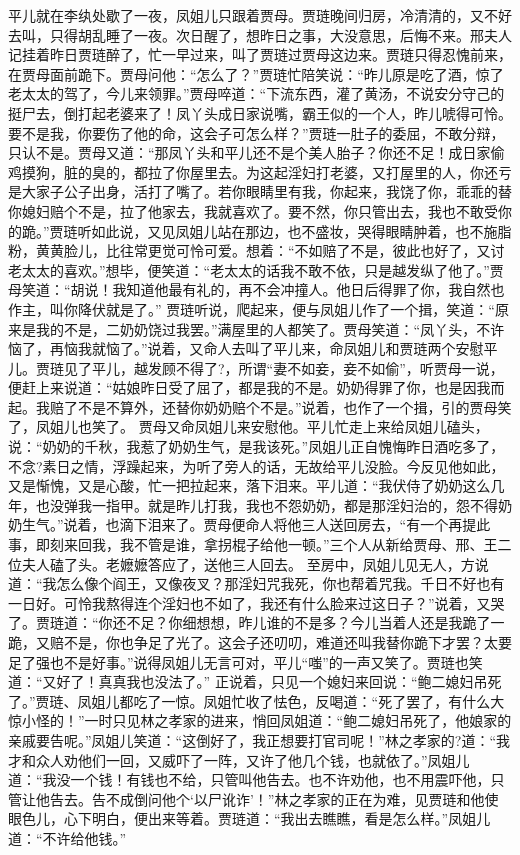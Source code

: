\documentclass[12pt,oneside]{book}
\begin{document}
平儿就在李纨处歇了一夜，凤姐儿只跟着贾母。贾琏晚间归房，冷清清的，又不好去叫，只得胡乱睡了一夜。次日醒了，想昨日之事，大没意思，后悔不来。邢夫人记挂着昨日贾琏醉了，忙一早过来，叫了贾琏过贾母这边来。贾琏只得忍愧前来，在贾母面前跪下。贾母问他：“怎么了？”贾琏忙陪笑说：“昨儿原是吃了酒，惊了老太太的驾了，今儿来领罪。”贾母啐道：“下流东西，灌了黄汤，不说安分守己的挺尸去，倒打起老婆来了！凤丫头成日家说嘴，霸王似的一个人，昨儿唬得可怜。要不是我，你要伤了他的命，这会子可怎么样？”贾琏一肚子的委屈，不敢分辩，只认不是。贾母又道：“那凤丫头和平儿还不是个美人胎子？你还不足！成日家偷鸡摸狗，脏的臭的，都拉了你屋里去。为这起淫妇打老婆，又打屋里的人，你还亏是大家子公子出身，活打了嘴了。若你眼睛里有我，你起来，我饶了你，乖乖的替你媳妇赔个不是，拉了他家去，我就喜欢了。要不然，你只管出去，我也不敢受你的跪。”贾琏听如此说，又见凤姐儿站在那边，也不盛妆，哭得眼睛肿着，也不施脂粉，黄黄脸儿，比往常更觉可怜可爱。想着：“不如赔了不是，彼此也好了，又讨老太太的喜欢。”想毕，便笑道：“老太太的话我不敢不依，只是越发纵了他了。”贾母笑道：“胡说！我知道他最有礼的，再不会冲撞人。他日后得罪了你，我自然也作主，叫你降伏就是了。”
贾琏听说，爬起来，便与凤姐儿作了一个揖，笑道：“原来是我的不是，二奶奶饶过我罢。”满屋里的人都笑了。贾母笑道：“凤丫头，不许恼了，再恼我就恼了。”说着，又命人去叫了平儿来，命凤姐儿和贾琏两个安慰平儿。贾琏见了平儿，越发顾不得了?，所谓“妻不如妾，妾不如偷”，听贾母一说，便赶上来说道：“姑娘昨日受了屈了，都是我的不是。奶奶得罪了你，也是因我而起。我赔了不是不算外，还替你奶奶赔个不是。”说着，也作了一个揖，引的贾母笑了，凤姐儿也笑了。
贾母又命凤姐儿来安慰他。平儿忙走上来给凤姐儿磕头，说：“奶奶的千秋，我惹了奶奶生气，是我该死。”凤姐儿正自愧悔昨日酒吃多了，不念?素日之情，浮躁起来，为听了旁人的话，无故给平儿没脸。今反见他如此，又是惭愧，又是心酸，忙一把拉起来，落下泪来。平儿道：“我伏侍了奶奶这么几年，也没弹我一指甲。就是昨儿打我，我也不怨奶奶，都是那淫妇治的，怨不得奶奶生气。”说着，也滴下泪来了。贾母便命人将他三人送回房去，“有一个再提此事，即刻来回我，我不管是谁，拿拐棍子给他一顿。”三个人从新给贾母、邢、王二位夫人磕了头。老嬷嬷答应了，送他三人回去。
至房中，凤姐儿见无人，方说道：“我怎么像个阎王，又像夜叉？那淫妇咒我死，你也帮着咒我。千日不好也有一日好。可怜我熬得连个淫妇也不如了，我还有什么脸来过这日子？”说着，又哭了。贾琏道：“你还不足？你细想想，昨儿谁的不是多？今儿当着人还是我跪了一跪，又赔不是，你也争足了光了。这会子还叨叨，难道还叫我替你跪下才罢？太要足了强也不是好事。”说得凤姐儿无言可对，平儿“嗤”的一声又笑了。贾琏也笑道：“又好了！真真我也没法了。”
正说着，只见一个媳妇来回说：“鲍二媳妇吊死了。”贾琏、凤姐儿都吃了一惊。凤姐忙收了怯色，反喝道：“死了罢了，有什么大惊小怪的！”一时只见林之孝家的进来，悄回凤姐道：“鲍二媳妇吊死了，他娘家的亲戚要告呢。”凤姐儿笑道：“这倒好了，我正想要打官司呢！”林之孝家的?道：“我才和众人劝他们一回，又威吓了一阵，又许了他几个钱，也就依了。”凤姐儿道：“我没一个钱！有钱也不给，只管叫他告去。也不许劝他，也不用震吓他，只管让他告去。告不成倒问他个‘以尸讹诈’！”林之孝家的正在为难，见贾琏和他使眼色儿，心下明白，便出来等着。贾琏道：“我出去瞧瞧，看是怎么样。”凤姐儿道：“不许给他钱。”
\end{document}
